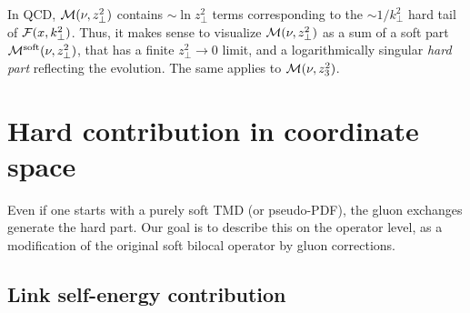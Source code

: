 \documentclass[final,5p,times,twocolumn]{elsarticle}
\begin{document}
In QCD,  $ {\cal M} (\nu,  z_\perp^2) $ contains  \mbox{$\sim \ln z_\perp^2$}  terms 
corresponding to   the  $\sim 1/k_\perp^2$ hard tail of ${\cal  F} (x, k_\perp^2)$.
Thus,  it makes sense to visualize 
$ {\cal M}  (\nu, z_\perp^2)  $    
as a sum of a soft part $ {\cal M}^{\rm soft} (\nu, z_\perp^2)$, 
that has a finite $z_\perp^2\to 0$ limit,  
and a  logarithmically singular {\it hard part}      reflecting   the evolution. 
The same applies to   $ {\cal M}  (\nu, z_3^2)  $. 






 \setcounter{equation}{0}  


\section{Hard contribution in coordinate space}


      Even if one starts with a purely soft  TMD (or pseudo-PDF),   
 the      gluon exchanges
 generate the hard part.   
Our goal is  to 
 describe  this  on the  operator level,
as a modification of the original 
soft  %
 bilocal operator by 
 gluon corrections.  
 

 
 \subsection{Link self-energy  contribution} 
\end{document}
